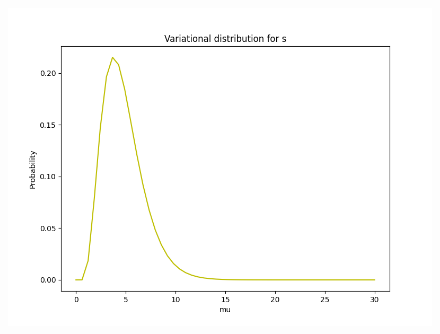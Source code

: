 \documentclass{article}
\begin{document}
\begin{enumerate}
\begin{figure}[!ht]
	\centering
	\includegraphics[scale=0.5]{../figs/5_daphne_pdf}
\end{figure}

\end{enumerate}
\end{document}
